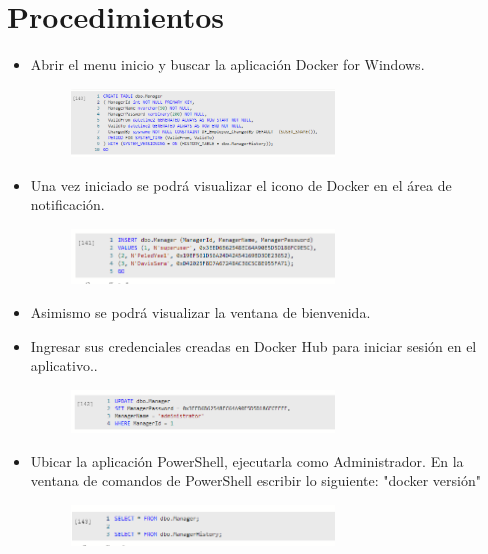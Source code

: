 \section{Procedimientos} 

\begin{itemize}
\subsection{ Iniciando Docker:}
	\item Abrir el menu inicio y buscar la aplicación Docker for Windows.
                    \begin{figure}[H]
		\begin{center}
		\includegraphics[width=7cm]{./Imagenes/s1}
		\end{center}
		\end{figure}
	\item Una vez iniciado se podrá visualizar el icono de Docker en el área de notificación.
   \begin{figure}[H]
		\begin{center}
		\includegraphics[width=7cm]{./Imagenes/s2}
		\end{center}
		\end{figure}
          \item Asimismo se podrá visualizar la ventana de bienvenida.
          \item Ingresar sus credenciales creadas en Docker Hub para iniciar sesión en el aplicativo..
   \begin{figure}[H]
		\begin{center}
		\includegraphics[width=7cm]{./Imagenes/s3}
		\end{center}
		\end{figure} 
          \item Ubicar la aplicación PowerShell, ejecutarla como Administrador. En la ventana de comandos de PowerShell escribir lo siguiente: "docker versión"
                       \begin{figure}[H]
		\begin{center}
		\includegraphics[width=7cm]{./Imagenes/s4}
		\end{center}
		\end{figure}   


\end{itemize}
